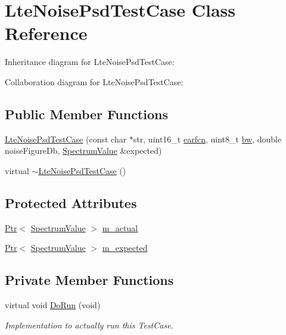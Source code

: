 \hypertarget{classLteNoisePsdTestCase}{}\section{Lte\+Noise\+Psd\+Test\+Case Class Reference}
\label{classLteNoisePsdTestCase}


Inheritance diagram for Lte\+Noise\+Psd\+Test\+Case\+:


Collaboration diagram for Lte\+Noise\+Psd\+Test\+Case\+:
\subsection*{Public Member Functions}
\begin{DoxyCompactItemize}
\item 
\hyperlink{classLteNoisePsdTestCase_a83e5cdc331ce0abafa384d7833da27fb}{Lte\+Noise\+Psd\+Test\+Case} (const char $\ast$str, uint16\+\_\+t \hyperlink{generate__test__data__lte__spectrum__value__txpsd_8m_a584be7562abb392609629331f8c6c42c}{earfcn}, uint8\+\_\+t \hyperlink{lte__ue__measurements_8m_a3f7228a3941f19f282647a09dd494528}{bw}, double noise\+Figure\+Db, \hyperlink{classns3_1_1SpectrumValue}{Spectrum\+Value} \&expected)
\item 
virtual \hyperlink{classLteNoisePsdTestCase_ad73f9e1075fdc2fcc2efdaad72a12e69}{$\sim$\+Lte\+Noise\+Psd\+Test\+Case} ()
\end{DoxyCompactItemize}
\subsection*{Protected Attributes}
\begin{DoxyCompactItemize}
\item 
\hyperlink{classns3_1_1Ptr}{Ptr}$<$ \hyperlink{classns3_1_1SpectrumValue}{Spectrum\+Value} $>$ \hyperlink{classLteNoisePsdTestCase_a87402c22cfa92d3c238bcfd5e4bf3b21}{m\+\_\+actual}
\item 
\hyperlink{classns3_1_1Ptr}{Ptr}$<$ \hyperlink{classns3_1_1SpectrumValue}{Spectrum\+Value} $>$ \hyperlink{classLteNoisePsdTestCase_a858ff02723481be581009d18fdb18cb1}{m\+\_\+expected}
\end{DoxyCompactItemize}
\subsection*{Private Member Functions}
\begin{DoxyCompactItemize}
\item 
virtual void \hyperlink{classLteNoisePsdTestCase_afd4f3bd932b952fda89423e7dee87d97}{Do\+Run} (void)
\begin{DoxyCompactList}\small\item\em Implementation to actually run this Test\+Case. \end{DoxyCompactList}\end{DoxyCompactItemize}

